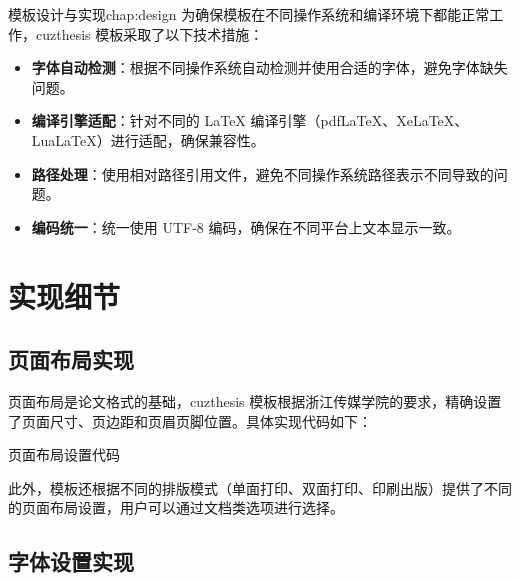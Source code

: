 \begin{cuzchapter}{模板设计与实现}{chap:design}
    为确保模板在不同操作系统和编译环境下都能正常工作，cuzthesis 模板采取了以下技术措施：

    \begin{itemize}
        \item \textbf{字体自动检测}：根据不同操作系统自动检测并使用合适的字体，避免字体缺失问题。

        \item \textbf{编译引擎适配}：针对不同的 LaTeX 编译引擎（pdfLaTeX、XeLaTeX、LuaLaTeX）进行适配，确保兼容性。

        \item \textbf{路径处理}：使用相对路径引用文件，避免不同操作系统路径表示不同导致的问题。

        \item \textbf{编码统一}：统一使用 UTF-8 编码，确保在不同平台上文本显示一致。
    \end{itemize}

    \section{实现细节}\label{sec:implementation-details}

    \subsection{页面布局实现}

    页面布局是论文格式的基础，cuzthesis 模板根据浙江传媒学院的要求，精确设置了页面尺寸、页边距和页眉页脚位置。具体实现代码如下：

    \begin{listing}[htbp]
        \caption{页面布局设置代码}
        \label{code:page-layout}
        \begin{texcode}
            \RequirePackage{geometry}
            \geometry{
                paper=a4paper,
                top=2.5cm, bottom=2.5cm,
                left=3cm, right=2cm,
                headheight=0.5cm, footskip=0.8cm
            }
        \end{texcode}
    \end{listing}

    此外，模板还根据不同的排版模式（单面打印、双面打印、印刷出版）提供了不同的页面布局设置，用户可以通过文档类选项进行选择。

    \subsection{字体设置实现}


\end{cuzchapter}
